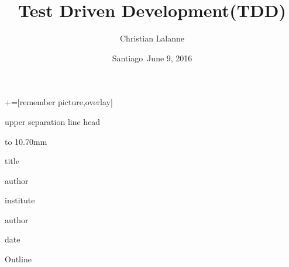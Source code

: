 \documentclass[notes=hide,xcolor=svgnames,professionalfonts,lualatex]{beamer}
\title[Test Driven Development(TDD)]
{Test Driven Development(TDD)}
\author[Christian Lalanne \emph{et. al}] %
{\textcolor{CherryRed}{Christian Lalanne}}
\institute[ZWEICOM] %
{
     \emph{Zweicom}    
}
\date[June 19, 2016] %
{Santiago\ June 9, 2016}
\begin{document}
+=[remember picture,overlay]

\begin{frame}[plain]
 \begin{beamercolorbox}[wd=1.0\paperwidth,colsep=2.5pt]{upper separation line head}
 \end{beamercolorbox}    
\begin{beamercolorbox}[wd=1.0\paperwidth,colsep=2.5pt]{}
\vbox to 10.70mm {%
 \vfill {\hskip0mm } \vfil%
}%
\end{beamercolorbox}

\begin{center}
\begin{beamercolorbox}[wd=1.0\paperwidth,center,ht=13.0mm]{title}
  \begin{minipage}{0.65\paperwidth}
   \begin{center}
    \inserttitle
    \end{center}
  \end{minipage}
\end{beamercolorbox}

\begin{beamercolorbox}[wd=\paperwidth,center,ht=11mm]{author}
   \insertauthor
\end{beamercolorbox}

\begin{beamercolorbox}[wd=\paperwidth,center,ht=7mm]{institute}
    \insertinstitute
\end{beamercolorbox}

\begin{beamercolorbox}[wd=\paperwidth,center,ht=9mm]{author}
\end{beamercolorbox}

\begin{beamercolorbox}[wd=\paperwidth,center,ht=13mm]{date}
  \insertdate
\end{beamercolorbox}

\end{center}
\addtocounter{framenumber}{-1}
\end{frame}

\begin{frame}{Outline}
  \begin{tikzpicture}[]
  \end{tikzpicture}
  \tableofcontents
\addtocounter{framenumber}{-1}
\end{frame}
\end{document}

